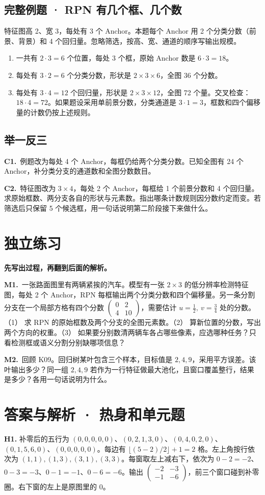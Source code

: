 \documentclass[UTF8,a4paper,11pt]{ctexart}
\newcommand{\PracticeQuestion}[3]{\par\Needspace{4\baselineskip}\noindent\begin{minipage}{\linewidth}\textbf{#1.}\ #2\par\noindent\rule{0pt}{#3mm}\par\end{minipage}\par}
\begin{document}
\subsection{完整例题 · RPN 有几个框、几个数}
特征图高 2、宽 3，每处有 3 个 Anchor。本题每个 Anchor 用 2 个分类分数（前景、背景）和 4 个回归量。忽略筛选，按高、宽、通道的顺序写输出规模。

\begin{enumerate}
\item 一共有 $2\cdot3=6$ 个位置，每处 3 个框，原始 Anchor 数是 $6\cdot3=18$。
\item 每处有 $3\cdot2=6$ 个分类分数，形状是 $2\times3\times6$，全图 36 个分数。
\item 每处有 $3\cdot4=12$ 个回归量，形状是 $2\times3\times12$，全图 72 个量。交叉检查：$18\cdot4=72$。如果题设采用单前景分数，分类通道是 $3\cdot1=3$，框数和四个偏移量的计数仍按上述规则。
\end{enumerate}
\subsection{举一反三}
\PracticeQuestion{C1}{例题改为每处 4 个 Anchor，每框仍给两个分类分数。已知全图有 24 个 Anchor，补分类分支的通道数和全图分数数目。}{27}
\PracticeQuestion{C2}{特征图改为 $3\times4$，每处 2 个 Anchor，每框给 1 个前景分数和 4 个回归量。求原始框数、两分支各自的形状与元素数。指出哪条计数规则因分数约定而变。若筛选后只保留 5 个候选框，用一句话说明第二阶段接下来做什么。}{35}
\clearpage
\section{独立练习}
\textbf{先写出过程，再翻到后面的解析。}

\PracticeQuestion{M1}{一张路面图里有两辆紧挨的汽车。模型有一张 $2\times3$ 的低分辨率检测特征图，每处 2 个 Anchor，RPN 每框输出两个分类分数和四个偏移量。另一条分割分支在一个局部方格有四个分数 $\begin{pmatrix}0&2\\4&10\end{pmatrix}$，需要估计 $u=\frac12,\ v=\frac34$ 处的分数。（1） 求 RPN 的原始框数及两个分支的全图元素数。（2） 算新位置的分数，写出两个方向的权重。（3） 如果要分别数清两辆车各占哪些像素，应选哪种任务？只看检测框或语义分割分别缺哪项信息？}{40}
\PracticeQuestion{M2}{回顾 K09。回归树某叶包含三个样本，目标值是 $2,4,9$，采用平方误差。该叶输出多少？同一组 $2,4,9$ 若作为一行特征做最大池化，且窗口覆盖整行，结果是多少？各用一句话说明为什么。}{34}
\clearpage
\section{答案与解析 · 热身和单元题}
\textbf{H1.} 补零后的五行为 $(0,0,0,0,0)$、$(0,2,1,3,0)$、$(0,4,0,2,0)$、$(0,1,5,6,0)$、$(0,0,0,0,0)$。每边有 $\lfloor(5-2)/2\rfloor+1=2$ 格。左上角按行依次为 $(1,1),(1,3),(3,1),(3,3)$。每窗取左上减右下，依次为 $0-2=-2$、$0-3=-3$、$0-1=-1$、$0-6=-6$。输出 $\begin{pmatrix}-2&-3\\-1&-6\end{pmatrix}$，前三个窗口碰到补零圈。右下窗的左上是原图里的 0。
\end{document}
